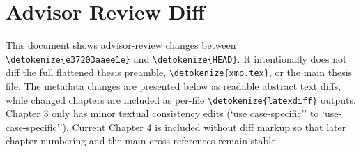\documentclass[12pt,a4paper]{report}
\newcommand{\type}[1]{\nolinkurl{\detokenize{#1}}}
\begin{document}
\tableofcontents

\chapter*{Advisor Review Diff}
This document shows advisor-review changes between \type{e37203aaee1e} and \type{HEAD}.
It intentionally does not diff the full flattened thesis preamble, \type{xmp.tex}, or the main thesis file.
The metadata changes are presented below as readable abstract text diffs, while changed chapters are included as per-file \type{latexdiff} outputs.
Chapter 3 only has minor textual consistency edits (`use case-specific'' to `use-case-specific'').
Current Chapter 4 is included without diff markup so that later chapter numbering and the main cross-references remain stable.











\clearpage

\appendix

\end{document}
